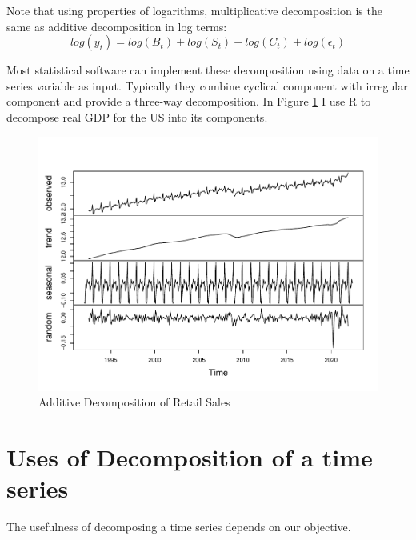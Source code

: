 \documentclass[]{book}
\theoremstyle{definition}
\theoremstyle{definition}
\theoremstyle{definition}
\theoremstyle{remark}
\begin{document}
Note that using properties of logarithms, multiplicative decomposition is the same as additive decomposition in log terms:
\begin{equation}
log(y_t)= log(B_t) + log(S_t) + log(C_t) + log(\epsilon_t)
\end{equation}

Most statistical software can implement these decomposition using data on a time series variable as input. Typically they combine cyclical component with irregular component and provide a three-way decomposition. In Figure \ref{fig:ch3-figure1} I use R to decompose real GDP for the US into its components.

\begin{figure}

{\centering \includegraphics[width=0.8\linewidth]{bookdown-demo_files/figure-latex/ch3-figure1-1} 

}

\caption{Additive Decomposition of Retail Sales}\label{fig:ch3-figure1}
\end{figure}

\hypertarget{uses-of-decomposition-of-a-time-series}{%
\section{Uses of Decomposition of a time series}\label{uses-of-decomposition-of-a-time-series}}

The usefulness of decomposing a time series depends on our objective.
\end{document}
